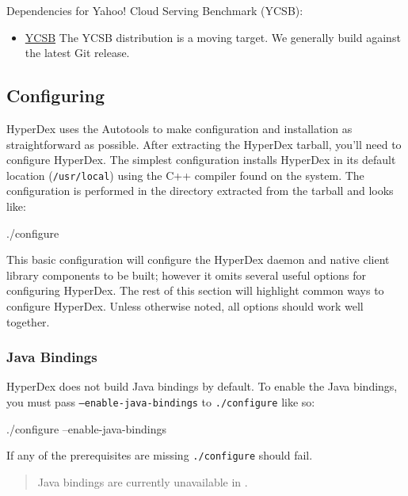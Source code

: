 Dependencies for Yahoo! Cloud Serving Benchmark (YCSB):

\begin{itemize}
\item \href{https://github.com/brianfrankcooper/YCSB/wiki}{YCSB} The YCSB
    distribution is a moving target.  We generally build against the latest Git
    release.
\end{itemize}

\subsection{Configuring}
\label{sec:installation:source:configure}

HyperDex uses the Autotools to make configuration and installation as
straightforward as possible.  After extracting the HyperDex tarball, you'll need
to configure HyperDex.  The simplest configuration installs HyperDex in its
default location (\texttt{/usr/local}) using the C++ compiler found on the
system.  The configuration is performed in the directory extracted from the
tarball and looks like:

\begin{consolecode}
./configure
\end{consolecode}

This basic configuration will configure the HyperDex daemon and native client
library components to be built; however it omits several useful options for
configuring HyperDex.  The rest of this section will highlight common ways to
configure HyperDex.  Unless otherwise noted, all options should work well
together.

\subsubsection{Java Bindings}
\label{sec:installation:source:java}

HyperDex does not build Java bindings by default.  To enable the Java bindings,
you must pass \texttt{--enable-java-bindings} to \texttt{./configure} like so:

\begin{consolecode}
./configure --enable-java-bindings
\end{consolecode}

If any of the prerequisites are missing \texttt{./configure} should fail.

\begin{quote}
Java bindings are currently unavailable in \HyperDexVersion.
\end{quote}

